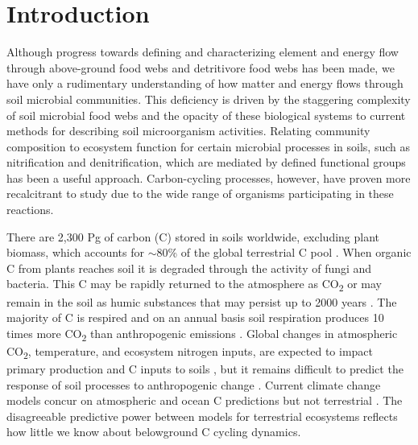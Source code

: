 \section{Introduction}
Although progress towards defining and characterizing element and energy flow through above-ground food webs and detritivore food webs has been made, we have only a rudimentary understanding of how matter and energy flows through soil microbial communities. This deficiency is driven by the staggering complexity of soil microbial food webs and the opacity of these biological systems to current methods for describing soil microorganism activities. Relating community composition to ecosystem function for certain microbial processes in soils, such as nitrification and denitrification, which are mediated by defined functional groups has been a useful approach. Carbon-cycling processes, however, have proven more recalcitrant to study due to the wide range of organisms participating in these reactions.
 
There are 2,300 Pg of carbon (C) stored in soils worldwide, excluding plant biomass, which accounts for $\sim$80\% of the global terrestrial C pool \cite{Amundson_2001,Mendelsohn_2001,IPCC2007Synth,elsen_Ayres_Wall_Bardgett_2011,Lal_2008,BATJES_1996,Lal_2008}. When organic C from plants reaches soil it is degraded through the activity of fungi and bacteria. This C may be rapidly returned to the atmosphere as CO\textsubscript{2} or may remain in the soil as humic substances that may persist up to 2000 years \cite{yanagita1990natural}. The majority of C is respired and on an annual basis soil respiration produces 10 times more CO\textsubscript{2} than anthropogenic emissions \cite{chapin2002principles}. Global changes in atmospheric CO\textsubscript{2}, temperature, and ecosystem nitrogen inputs, are expected to impact primary production and C inputs to soils \citep{Groenigen_2006}, but it remains difficult to predict the response of soil processes to anthropogenic change \cite{DAVIDSON_2006}. Current climate change models concur on atmospheric and ocean C predictions but not terrestrial \cite{Friedlingstein_2006}. The disagreeable predictive power between models for terrestrial ecosystems reflects how little we know about belowground C cycling dynamics. 

